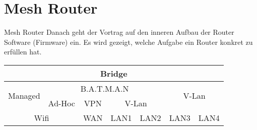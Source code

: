 \section{Mesh Router}

\begin{frame}{Mesh Router}
Danach geht der Vortrag auf den inneren Aufbau der Router Software
(Firmware) ein. Es wird gezeigt, welche Aufgabe ein Router konkret
zu erfüllen hat.

\renewcommand{\arraystretch}{1.5}
\begin{tabular}{|c|c|c|c|c|c|c|} \hline
 \multicolumn{7}{|c|}{Bridge} \\ \hline
 \multirow{2}{*}{Managed} & \multicolumn{4}{c|}{B.A.T.M.A.N} & \multicolumn{2}{c|}{\multirow{2}{*}{V-Lan}} \\ \cline{2-5}
 & Ad-Hoc & VPN & \multicolumn{2}{c|}{V-Lan} & \multicolumn{2}{c|}{} \\ \hline
 \multicolumn{2}{|c|}{Wifi} & WAN & LAN1 & LAN2 & LAN3 & LAN4 \\ \hline
\end{tabular}

\end{frame}
